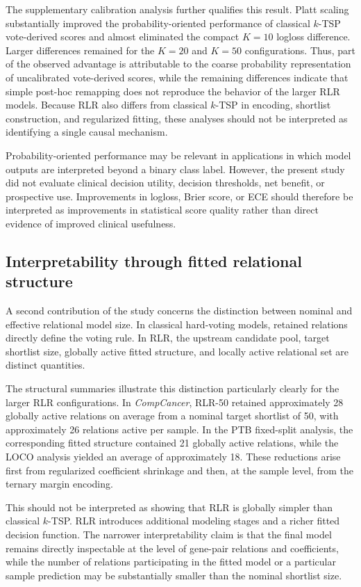 \documentclass[journal]{IEEEtran}
\begin{document}
The supplementary calibration analysis further qualifies this result. Platt scaling substantially improved the probability-oriented performance of classical $k$-TSP vote-derived scores and almost eliminated the compact $K=10$ logloss difference. Larger differences remained for the $K=20$ and $K=50$ configurations. Thus, part of the observed advantage is attributable to the coarse probability representation of uncalibrated vote-derived scores, while the remaining differences indicate that simple post-hoc remapping does not reproduce the behavior of the larger RLR models. Because RLR also differs from classical $k$-TSP in encoding, shortlist construction, and regularized fitting, these analyses should not be interpreted as identifying a single causal mechanism.

Probability-oriented performance may be relevant in applications in which model outputs are interpreted beyond a binary class label. However, the present study did not evaluate clinical decision utility, decision thresholds, net benefit, or prospective use. Improvements in logloss, Brier score, or ECE should therefore be interpreted as improvements in statistical score quality rather than direct evidence of improved clinical usefulness.

\subsection{Interpretability through fitted relational structure}

A second contribution of the study concerns the distinction between nominal and effective relational model size. In classical hard-voting models, retained relations directly define the voting rule. In RLR, the upstream candidate pool, target shortlist size, globally active fitted structure, and locally active relational set are distinct quantities.

The structural summaries illustrate this distinction particularly clearly for the larger RLR configurations. In \emph{CompCancer}, RLR-50 retained approximately 28 globally active relations on average from a nominal target shortlist of 50, with approximately 26 relations active per sample. In the PTB fixed-split analysis, the corresponding fitted structure contained 21 globally active relations, while the LOCO analysis yielded an average of approximately 18. These reductions arise first from regularized coefficient shrinkage and then, at the sample level, from the ternary margin encoding.

This should not be interpreted as showing that RLR is globally simpler than classical $k$-TSP. RLR introduces additional modeling stages and a richer fitted decision function. The narrower interpretability claim is that the final model remains directly inspectable at the level of gene-pair relations and coefficients, while the number of relations participating in the fitted model or a particular sample prediction may be substantially smaller than the nominal shortlist size.
\end{document}
